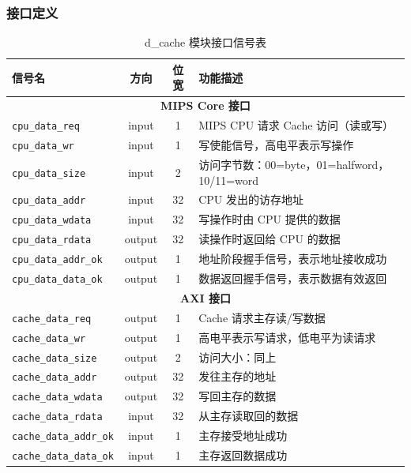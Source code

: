 \subsubsection{接口定义}
\begin{table}[H]
\centering
\caption{d\_cache 模块接口信号表}
\begin{tabular}{|l|c|c|p{7.5cm}|}
\hline
\textbf{信号名} & \textbf{方向} & \textbf{位宽} & \textbf{功能描述} \\ \hline \hline
\multicolumn{4}{|c|}{\textbf{MIPS Core 接口}} \\ \hline
\texttt{cpu\_data\_req}     & input  & 1       & MIPS CPU 请求 Cache 访问（读或写） \\ \hline
\texttt{cpu\_data\_wr}      & input  & 1       & 写使能信号，高电平表示写操作 \\ \hline
\texttt{cpu\_data\_size}    & input  & 2       & 访问字节数：00=byte，01=halfword，10/11=word \\ \hline
\texttt{cpu\_data\_addr}    & input  & 32      & CPU 发出的访存地址 \\ \hline
\texttt{cpu\_data\_wdata}   & input  & 32      & 写操作时由 CPU 提供的数据 \\ \hline
\texttt{cpu\_data\_rdata}   & output & 32      & 读操作时返回给 CPU 的数据 \\ \hline
\texttt{cpu\_data\_addr\_ok} & output & 1       & 地址阶段握手信号，表示地址接收成功 \\ \hline
\texttt{cpu\_data\_data\_ok} & output & 1       & 数据返回握手信号，表示数据有效返回 \\ \hline

\multicolumn{4}{|c|}{\textbf{AXI 接口}} \\ \hline
\texttt{cache\_data\_req}   & output & 1       & Cache 请求主存读/写数据 \\ \hline
\texttt{cache\_data\_wr}    & output & 1       & 高电平表示写请求，低电平为读请求 \\ \hline
\texttt{cache\_data\_size}  & output & 2       & 访问大小：同上 \\ \hline
\texttt{cache\_data\_addr}  & output & 32      & 发往主存的地址 \\ \hline
\texttt{cache\_data\_wdata} & output & 32      & 写回主存的数据 \\ \hline
\texttt{cache\_data\_rdata} & input  & 32      & 从主存读取回的数据 \\ \hline
\texttt{cache\_data\_addr\_ok} & input & 1     & 主存接受地址成功 \\ \hline
\texttt{cache\_data\_data\_ok} & input & 1     & 主存返回数据成功 \\ \hline
\end{tabular}
\end{table}

